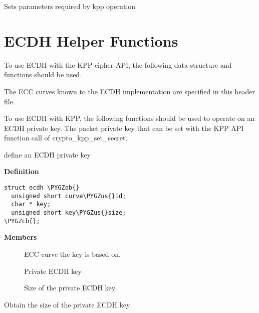 \documentclass[a4paper,8pt,english]{sphinxmanual}
\def\PYGZus{\char`\_}
\def\PYGZob{\char`\{}
\def\PYGZcb{\char`\}}
\begin{document}
Sets parameters required by kpp operation


\section{ECDH Helper Functions}
\label{crypto/api-kpp:ecdh-helper-functions}
To use ECDH with the KPP cipher API, the following data structure and
functions should be used.

The ECC curves known to the ECDH implementation are specified in this
header file.

To use ECDH with KPP, the following functions should be used to operate on
an ECDH private key. The packet private key that can be set with
the KPP API function call of crypto\_kpp\_set\_secret.

\begin{fulllineitems}
\label{crypto/api-kpp:c.ecdh}
define an ECDH private key

\end{fulllineitems}


\textbf{Definition}

\begin{Verbatim}[commandchars=\\\{\}]
struct ecdh \PYGZob{}
  unsigned short curve\PYGZus{}id;
  char * key;
  unsigned short key\PYGZus{}size;
\PYGZcb{};
\end{Verbatim}

\textbf{Members}
\begin{description}
\item[{}] \leavevmode
ECC curve the key is based on.

\item[{}] \leavevmode
Private ECDH key

\item[{}] \leavevmode
Size of the private ECDH key

\end{description}

\begin{fulllineitems}
\label{crypto/api-kpp:c.crypto_ecdh_key_len}
Obtain the size of the private ECDH key

\end{fulllineitems}
\end{document}
